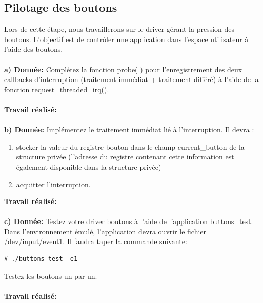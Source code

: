 \subsection{Pilotage des boutons}
Lors de cette étape, nous travaillerons sur le driver gérant la pression des boutons. L'objectif est de
contrôler une application dans l'espace utilisateur à l'aide des boutons.\\\\
\textbf{a) Donnée: }Complétez la fonction probe( ) pour l'enregistrement des deux callbacks d'interruption (traitement
immédiat + traitement différé) à l'aide de la fonction request\_threaded\_irq().\\\\
\textbf{Travail réalisé: }\\\\
\textbf{b) Donnée: }Implémentez le traitement immédiat lié à l'interruption. Il devra :
\begin{enumerate}
	\item stocker la valeur du registre bouton dans le champ current\_button de la structure privée
	(l'adresse du registre contenant cette information est également disponible dans la structure
	privée)
	\item acquitter l'interruption.\\
\end{enumerate}
\textbf{Travail réalisé: }\\\\
\textbf{c) Donnée: }Testez votre driver boutons à l'aide de l'application buttons\_test. Dans l'environnement émulé,
l'application devra ouvrir le fichier /dev/input/event1. Il faudra taper la commande suivante:
\begin{lstlisting}
# ./buttons_test -e1
\end{lstlisting}
Testez les boutons un par un.\\\\
\textbf{Travail réalisé: }\\\\